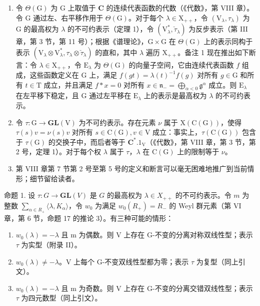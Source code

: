 \begin{enumerate}
\def\labelenumi{\arabic{enumi})}
\setcounter{enumi}{1}
\item
  令 \(\Theta(\mathrm{G})\) 为 \(\mathrm{G}\) 上取值于 \(\mathbf{C}\) 的连续代表函数的代数（《代数》，第 VIII 章）。令 \(\mathrm{G}\) 通过左、右平移作用于 \(\Theta(\mathrm{G})\)。对于每个 \(\lambda \in \mathrm{X}_{++}\)，令 \((\mathrm{V}_{\lambda}, \tau_{\lambda})\) 为 \(\mathrm{G}\) 的最高权为 \(\lambda\) 的不可约表示（定理 1），令 \((\mathrm{V}_{\lambda}^{*}, \check{\tau}_{\lambda})\) 为反步表示（第 III 章，第 3 节，第 11 号）；根据《谱理论》，\(\mathrm{G} \times \mathrm{G}\) 在 \(\Theta(\mathrm{G})\) 上的表示同构于表示 \((\mathrm{V}_{\lambda} \otimes \mathrm{V}_{\lambda}^{*}, \tau_{\lambda} \otimes \check{\tau}_{\lambda})\) 的直和，其中 \(\lambda\) 遍历 \(\mathrm{X}_{++}\)。备注 1 现在推出如下断言：令 \(\lambda \in \mathrm{X}_{++}\)，令 \(\mathrm{E}_{\lambda}\) 为 \(\Theta(\mathrm{G})\) 的向量子空间，它由连续代表函数 \(f\) 组成，这些函数定义在 \(\mathrm{G}\) 上，满足 \(f(gt) = \lambda(t)^{-1} f(g)\) 对所有 \(g \in \mathrm{G}\) 和所有 \(t \in \mathrm{T}\) 成立，并且满足 \(f * x = 0\) 对所有 \(x \in \mathfrak{n}_{-} = \bigoplus_{\alpha < 0} \mathfrak{g}^{\alpha}\) 成立。则 \(\mathrm{E}_{\lambda}\) 在左平移下稳定，且 \(\mathrm{G}\) 通过左平移在 \(\mathrm{E}_{\lambda}\) 上的表示是最高权为 \(\lambda\) 的不可约表示。
\item
  令 \(\tau : \mathrm{G} \to \mathbf{GL}(\mathrm{V})\) 为不可约表示。存在元素 \(\nu\) 属于 \(\mathrm{X}(\mathrm{C}(\mathrm{G}))\)，使得 \(\tau(s)v = \nu(s)v\) 对所有 \(s \in \mathrm{C}(\mathrm{G}), v \in \mathrm{V}\) 成立：事实上，\(\tau(\mathrm{C}(\mathrm{G}))\) 包含于 \(\tau(\mathrm{G})\) 的交换子中，而后者等于 \(\mathbf{C}^*.1_{\mathrm{V}}\)（《代数》，第 VIII 章，第 3 节，第 2 号，定理 1）。对于每个权 \(\lambda\) 属于 \(\tau\)，\(\lambda\) 在 \(\mathrm{C}(\mathrm{G})\) 上的限制等于 \(\nu\)。
\item
  第 VIII 章第 7 节第 2 号至第 5 号的定义和断言可以毫无困难地推广到当前情形；细节留给读者。
\end{enumerate}

命题 1. 设 \(\tau : G \to \mathbf{GL}(V)\) 是 \(G\) 的最高权为 \(\lambda \in X_{++}\) 的不可约表示。令 \(m\) 为整数 \(\sum_{\alpha \in R_+} \langle \lambda, K_\alpha \rangle\)，令 \(w_0\) 为满足 \(w_0(R_+) = R_-\) 的 Weyl 群元素（第 VI 章，第 6 节，命题 17 的推论 3）。有三种可能的情形：

\begin{enumerate}
\def\labelenumi{\alph{enumi})}
\item
  \(w_{0}(\lambda) = -\lambda\) 且 m 为偶数。则 V 上存在 G-不变的分离对称双线性型；表示 \(\tau\) 为实型（附录 II）。
\item
  \(w_{0}(\lambda) \neq -\lambda\)。V 上每个 G-不变双线性型都为零；表示 \(\tau\) 为复型（同上引文）。
\item
  \(w_{0}(\lambda) = -\lambda\) 且 m 为奇数。则 V 上存在 G-不变的分离交错双线性型；表示 \(\tau\) 为四元数型（同上引文）。
\end{enumerate}

